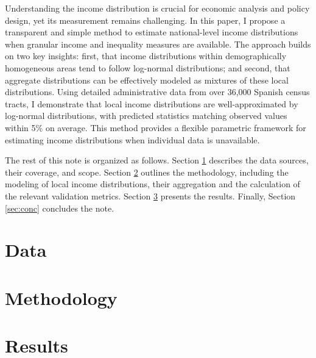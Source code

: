 \documentclass[letterpaper,11pt,leqno]{article}
\begin{document}
Understanding the income distribution is crucial for economic analysis and policy design, yet its measurement remains challenging. In this paper, I propose a transparent and simple method to estimate national-level income distributions when granular income and inequality measures are available. The approach builds on two key insights: first, that income distributions within demographically homogeneous areas tend to follow log-normal distributions; and second, that aggregate distributions can be effectively modeled as mixtures of these local distributions. Using detailed administrative data from over 36,000 Spanish census tracts, I demonstrate that local income distributions are well-approximated by log-normal distributions, with predicted statistics matching observed values within 5\% on average. This method provides a flexible parametric framework for estimating income distributions when individual data is unavailable.


The rest of this note is organized as follows. Section \ref{sec:data} describes the data sources, their coverage, and scope. Section \ref{sec:method} outlines the methodology, including the modeling of local income distributions, their aggregation and the calculation of the relevant validation metrics. Section \ref{sec:results} presents the results. Finally, Section \ref{sec:conc} concludes the note.

\section{Data}\label{sec:data}



\section{Methodology}\label{sec:method}



\section{Results}\label{sec:results}
\end{document}
